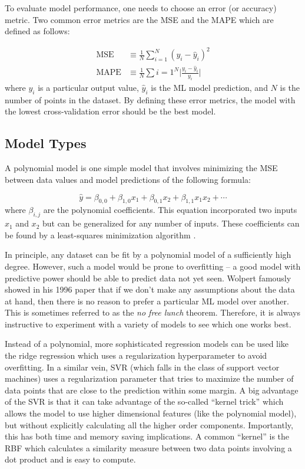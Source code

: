 To evaluate model performance, one needs to choose an error (or accuracy) metric. Two common error metrics are the \gls{MSE} and the \gls{MAPE} which are defined as follows: 

\begin{align}
	\text{MSE} &\equiv  \frac{1}{N} \sum_{i=1}^N (y_i - \hat{y}_i)^2 \\
	\text{MAPE} &\equiv \frac{1}{N} \sum{i=1}^N \lvert \frac{y_i - \hat{y}_i}{y_i} \rvert
\end{align}
where $y_i$ is a particular output value, $\hat{y}_i$ is the \gls{ML} model prediction, and $N$ is the number of points in the dataset. By defining these error metrics, the model with the lowest cross-validation error should be the best model. 

\subsection{Model Types}

A polynomial model is one simple model that involves minimizing the \gls{MSE} between data values and model predictions of the following formula: 

\begin{equation}
	\hat{y} = \beta_{0,0} + \beta_{1,0} x_1 + \beta_{0,1} x_2 + \beta_{1,1} x_1 x_2 + \cdots
\end{equation}
where $\beta_{i,j}$ are the polynomial coefficients. This equation incorporated two inputs $x_1$ and $x_2$ but can be generalized for any number of inputs. These coefficients can be found by a least-squares minimization algorithm \cite{Geron_2023_ML}. 

In principle, any dataset can be fit by a polynomial model of a sufficiently high degree. However, such a model would be prone to overfitting -- a good model with predictive power should be able to predict data not yet seen. Wolpert \cite{Wolpert_1997_IEEE} famously showed in his 1996 paper that if we don't make any assumptions about the data at hand, then there is no reason to prefer a particular \gls{ML} model over another. This is sometimes referred to as the \emph{no free lunch} theorem. Therefore, it is always instructive to experiment with a variety of models to see which one works best. 

Instead of a polynomial, more sophisticated regression models can be used like the ridge regression which uses a regularization hyperparameter to avoid overfitting. In a similar vein, \gls{SVR} (which falls in the class of support vector machines) uses a regularization parameter that tries to maximize the number of data points that are close to the prediction within some margin. A big advantage of the \gls{SVR} is that it can take advantage of the so-called ``kernel trick'' which allows the model to use higher dimensional features (like the polynomial model), but without explicitly calculating all the higher order components. Importantly, this has both time and memory saving implications. A common ``kernel'' is the \gls{RBF} which calculates a similarity measure between two data points involving a dot product and is easy to compute. 

